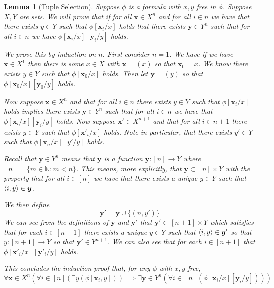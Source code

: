 \documentclass[12pt]{article}
\theoremstyle{break}
\theoremstyle{break}
\theoremstyle{break}
\theoremstyle{break}
\newtheorem{lemma}[theorem]{Lemma}
\theoremstyle{break}
\newtheorem{informal definition}[definition]{Informal Definition}
\newcommand{\bv}[1]{\boldsymbol{#1}}
\begin{document}
\begin{lemma}[Tuple Selection]
\label{lem:tupleselection}
Suppose $\phi$ is a formula with $x, y$ free in $\phi$.
Suppose $X, Y$ are sets.
We will prove that if for all $\boldsymbol{x} \in X^n$ and for all $i\in n$ we have that there exists $y\in Y$ such that $\phi[\boldsymbol{x}_i/x]$ holds that there exists $\boldsymbol{y}\in Y^n$ such that for all $i\in n$ we have $\phi[\boldsymbol{x}_i/x][\boldsymbol{y}_i/y]$ holds.

We prove this by induction on $n$.
First consider $n=1$.
We have if we have $\boldsymbol{x} \in X^1$ then there is some $x\in X$ with $\boldsymbol{x} = (x)$ so that $\boldsymbol{x}_0 = x$.
We know there exists $y\in Y$ such that $\phi[\boldsymbol{x}_0/x]$ holds.
Then let $\boldsymbol{y} = (y)$ so that $\phi[\bv{x}_0/x][\bv{y}_0/y]$ holds.

Now suppose $\boldsymbol{x}\in X^n$ and that for all $i \in n$ there exists $y\in Y$ such that $\phi[\boldsymbol{x}_i/x]$ holds implies there exists $\boldsymbol{y}\in Y^n$ such that for all $i\in n$ we have that $\phi[\bv{x}_i/x][\bv{y}_i/y]$ holds.
Now suppose $\boldsymbol{x}' \in X^{n+1}$ and that for all $i\in n+1$ there exists $y \in Y$ such that $\phi[\boldsymbol{x}'_i/x]$ holds.
Note in particular, that there exists $y' \in Y$ such that $\phi[\bv{x}_n /x][y'/y]$ holds.

Recall that $\bv{y} \in Y^n$ means that $\bv{y}$ is a function $\bv{y}:[n] \to Y$ where $[n] = \{m \in \mathbb{N}: m < n\}$.
This means, more explicitly, that $\bv{y} \subset [n] \times Y$ with the property that for all $i \in [n]$ we have that there exists a unique $y\in Y$ such that $\braket{i, y} \in \bv{y}$.

We then define
$$
\bv{y}' = \bv{y} \cup \{(n, y')\}
$$
We can see from the definitions of $\bv{y}$ and $\bv{y}'$ that $\bv{y}' \subset [n+1] \times Y$ which satisfies that for each $i\in [n+1]$ there exists a unique $y\in Y$ such that $\braket{i, y} \in \bv{y}'$ so that $y:[n+1] \to Y$ so that $\bv{y}' \in Y^{n+1}$.
We can also see that for each $i\in [n+1]$ that $\phi[\bv{x}'_i/x][\bv{y}'_i/y]$ holds.

This concludes the induction proof that, for any $\phi$ with $x, y$ free,
$$
\forall \bv{x}\in X^n (\forall i \in [n](\exists y (\phi[\bv{x}_i, y]))\implies \exists \bv{y}\in Y^n(\forall i \in [n](\phi[\bv{x}_i/x][\bv{y}_i/y])))
$$

\end{lemma}
\end{document}
